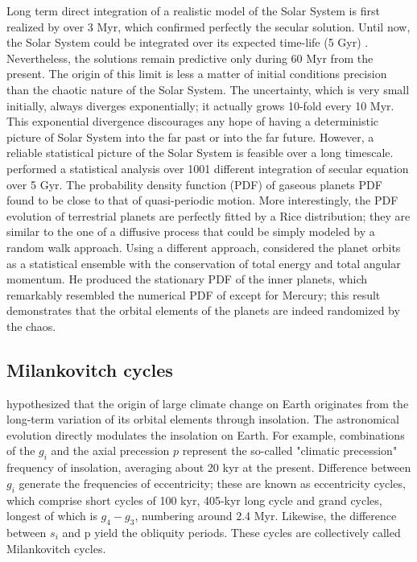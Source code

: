 \documentclass[12pt]{article}
\begin{document}
	Long term direct integration of a realistic model of the Solar System is first realized by \cite{quinn1991} over 3 Myr, which confirmed perfectly the secular solution. Until now, the Solar System could be integrated over its expected time-life (5 Gyr) \citep{Laskar2009}. Nevertheless, the solutions remain predictive only during 60 Myr from the present. The origin of this limit is less a matter of initial conditions precision than the chaotic nature of the Solar System. The uncertainty, which is very small initially, always diverges exponentially; it actually grows 10-fold every 10 Myr. This exponential divergence discourages any hope of having a deterministic picture of Solar System into the far past or into the far future. However, a reliable statistical picture of the Solar System is feasible over a long timescale. \cite{laskar2008} performed a statistical analysis over 1001 different integration of secular equation over 5 Gyr. The probability density function (PDF) of gaseous planets PDF found to be close to that of quasi-periodic motion. More interestingly, the PDF evolution of terrestrial planets are perfectly fitted by a Rice distribution; they are similar to the one of a diffusive process that could be simply modeled by a random walk approach. Using a different approach, \cite{federico2017} considered the planet orbits as a statistical ensemble with the conservation of total energy and total angular momentum. He produced the stationary PDF of the inner planets, which remarkably resembled the numerical PDF of \cite{laskar2008} except for Mercury; this result demonstrates that the orbital elements of the planets are indeed randomized by the chaos.
	
	\subsection{Milankovitch cycles}
	
	\citet{milankovitch1941canon} hypothesized that the origin of large climate change on Earth originates from the long-term variation of its orbital elements through insolation. The astronomical evolution directly modulates the insolation on Earth. For example, combinations of the $g_i$  and the axial precession $p$  represent the so-called "climatic precession" frequency of insolation, averaging about 20 kyr at the present.
	Difference between $g_i$ generate the frequencies of eccentricity; these are known as eccentricity cycles, which comprise short cycles of 100 kyr, 405-kyr long cycle and grand cycles, longest of which is $g_4-g_3$, numbering around 2.4 Myr.
	Likewise, the difference between $s_i$ and p yield the obliquity periods. These cycles are collectively called Milankovitch cycles.
	
\end{document}
